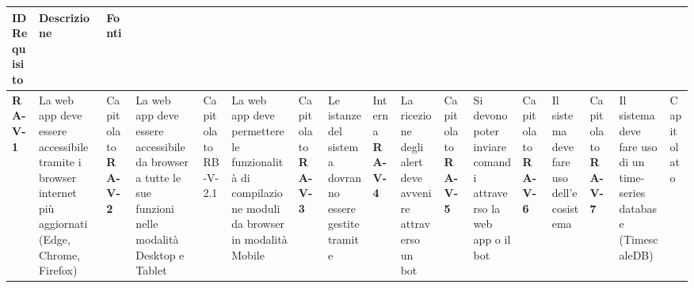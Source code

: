 	\begin{center}
		\begin{longtable}{|p{3cm}|p{9.85cm}|p{2cm}|}
		\hline
		\rowcolor{blue_requisiti}
		{\color{white} \textbf{ID Requisito} } & {\color{white} \textbf{Descrizione} } & {\color{white} \textbf{Fonti} } \\ 
		\hline
		\endhead

		\textbf{RA-V-1} & La web app deve essere accessibile tramite i browser internet più aggiornati (Edge, Chrome, Firefox) & Capitolato \autism
		\textbf{RA-V-2} & La web app deve essere accessibile da browser a tutte le sue funzioni nelle modalità Desktop e Tablet & Capitolato \autism
		{\color{gray} RB-V-}2.1 & La web app deve permettere le funzionalità di compilazione moduli da browser in modalità Mobile & Capitolato \autism
		\textbf{RA-V-3} & Le istanze del sistema dovranno essere gestite tramite  & Interna \autism
		\textbf{RA-V-4} & La ricezione degli alert deve avvenire attraverso un bot  & Capitolato \autism
		\textbf{RA-V-5} & Si devono poter inviare comandi attraverso la web app o il bot  & Capitolato \autism
		\textbf{RA-V-6} & Il sistema deve fare uso dell'ecosistema  & Capitolato \autism
		\textbf{RA-V-7} & Il sistema deve fare uso di un time-series database (TimescaleDB) & Capitolato \autism


		\end{longtable}
	\end{center}
